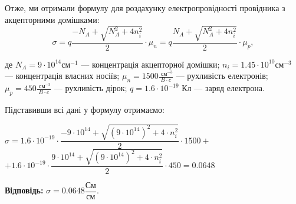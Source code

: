 \documentclass[a4paper,12pt]{article}
\begin{document}
Отже,  ми отримали формулу для роздахунку електропровідності провідника з акцепторними домішками:
\begin{equation}
\sigma=q \dfrac{-N_A+ \sqrt{N_A^2 + 4n_i^2}}{2}\cdot \mu_n=q \dfrac{N_A+ \sqrt{N_A^2 + 4n_i^2}}{2}\cdot \mu_p,
\label{eq:ref}
\end{equation}

 де $N_A = 9\cdot 10^{14}\text{$\text{см}^{-1}$}$ --- концентрація акцепторної домішки; 
 $n_i = 1.45\cdot 10^{10}\text{$\text{см}^{-3}$}$ --- концентрація власних носіїв; 
 $\mu_n = 1500 \frac{\text{$\text{ см}^{-3}$}}{B\cdot c}$ --- рухливість електронів; 
 $\mu_p = 450\frac{\text{$\text{ см}^{-3}$}}{B\cdot c}$ --- рухливість дірок; 
 $q=1.6\cdot10^{-19} \text{ Кл}$ --- заряд електрона. 
 \vspace{1cm}

Підставивши всі дані у формулу отримаємо:\\
\begin{center}
$\sigma = 1.6\cdot10^{-19}\cdot \dfrac {-9\cdot 10^{14} +\sqrt{(9\cdot 10^{14})^2 + 4\cdot n_i^2}}{2} \cdot 1500 + $ \\
\vspace{0.3cm}
$+ 1.6\cdot10^{-19}\cdot \dfrac {9\cdot 10^{14} +\sqrt{(9\cdot 10^{14})^2 + 4\cdot n_i^2}}{2} \cdot 450 = 0.0648$
\end{center}

\textbf{Відповідь:} 
$\sigma = 0.0648 \dfrac{ \text{См}} {\text{см}}. $
\end{document}

